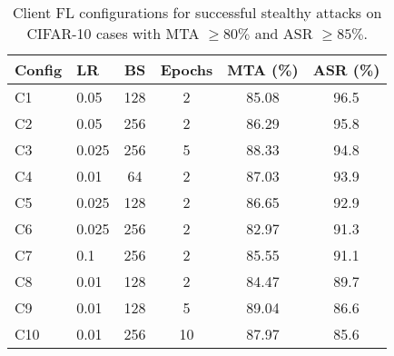 \begin{table}[h]
    \centering
    \small
    \begin{tabular}{llcc|cc}
    \toprule
    \textbf{Config} & \textbf{LR} & \textbf{BS} & \textbf{Epochs} & \textbf{MTA (\%)} & \textbf{ASR (\%)} \\
    \midrule
    C1 & 0.05 & 128 & 2 & 85.08 & 96.5 \\
    C2 & 0.05 & 256 & 2 & 86.29 & 95.8 \\
    C3 & 0.025 & 256 & 5 & 88.33 & 94.8 \\
    C4 & 0.01 & 64 & 2 & 87.03 & 93.9  \\
    C5 & 0.025 & 128 & 2 & 86.65 & 92.9 \\
    C6 & 0.025 & 256 & 2 & 82.97 & 91.3 \\
    C7 & 0.1 & 256 & 2 & 85.55 & 91.1 \\
    C8 & 0.01 & 128 & 2 & 84.47 & 89.7 \\ 
    C9 & 0.01 & 128 & 5 & 89.04 & 86.6\\
    C10 & 0.01 & 256 & 10 & 87.97 & 85.6 \\
    \bottomrule
    \end{tabular}
    \caption{Client FL configurations for successful stealthy attacks on CIFAR-10 \ie cases with MTA $\geq 80\%$ and ASR $\geq 85\%$. }
    \label{tab:fl_setup_exps}
\end{table}
